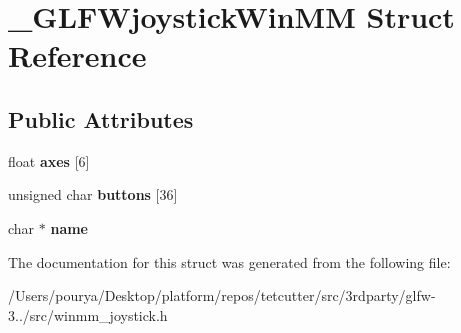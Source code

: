 \hypertarget{struct__GLFWjoystickWinMM}{}\section{\+\_\+\+G\+L\+F\+Wjoystick\+Win\+M\+M Struct Reference}
\label{struct__GLFWjoystickWinMM}
\subsection*{Public Attributes}
\begin{DoxyCompactItemize}
\item 
\hypertarget{struct__GLFWjoystickWinMM_a82de357192cbbbf063588d1e1e7164ef}{}float {\bfseries axes} \mbox{[}6\mbox{]}\label{struct__GLFWjoystickWinMM_a82de357192cbbbf063588d1e1e7164ef}

\item 
\hypertarget{struct__GLFWjoystickWinMM_a77a86234f461c6b7f0a0fdad339e6868}{}unsigned char {\bfseries buttons} \mbox{[}36\mbox{]}\label{struct__GLFWjoystickWinMM_a77a86234f461c6b7f0a0fdad339e6868}

\item 
\hypertarget{struct__GLFWjoystickWinMM_af3c8e8ecd03f4534720107ddafbf63ad}{}char $\ast$ {\bfseries name}\label{struct__GLFWjoystickWinMM_af3c8e8ecd03f4534720107ddafbf63ad}

\end{DoxyCompactItemize}


The documentation for this struct was generated from the following file\+:\begin{DoxyCompactItemize}
\item 
/\+Users/pourya/\+Desktop/platform/repos/tetcutter/src/3rdparty/glfw-\/3../src/winmm\+\_\+joystick.\+h\end{DoxyCompactItemize}
